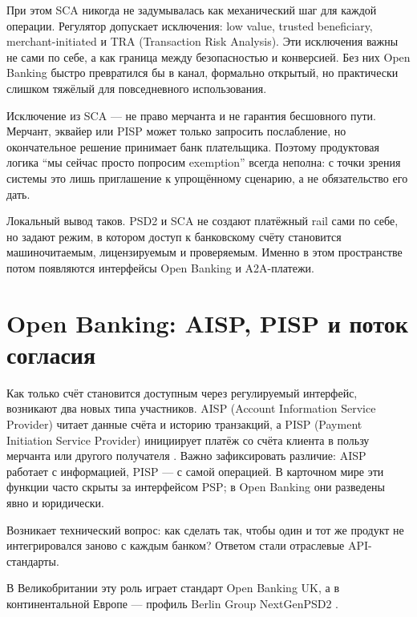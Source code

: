 При этом SCA никогда не задумывалась как механический шаг для каждой
операции. Регулятор допускает исключения: low value, trusted beneficiary,
merchant-initiated и TRA (Transaction Risk Analysis). Эти исключения
важны не сами по себе, а как граница между безопасностью и конверсией.
Без них Open Banking быстро превратился бы в канал, формально открытый,
но практически слишком тяжёлый для повседневного использования.

\begin{kaobox}[title=Важно, colback=red!5, colbacktitle=red!20]
  Исключение из SCA — не право мерчанта и не гарантия бесшовного пути.
  Мерчант, эквайер или PISP может только запросить послабление,
  но окончательное решение принимает банк плательщика. Поэтому
  продуктовая логика \enquote{мы сейчас просто попросим exemption}
  всегда неполна: с точки зрения системы это лишь приглашение
  к упрощённому сценарию, а не обязательство его дать.
\end{kaobox}

Локальный вывод таков. PSD2 и SCA не создают платёжный rail сами
по себе, но задают режим, в котором доступ к банковскому счёту
становится машиночитаемым, лицензируемым и проверяемым. Именно
в этом пространстве потом появляются интерфейсы Open Banking
и A2A-платежи.

\section{Open Banking: AISP, PISP и поток согласия}
\label{sec:open-banking}

Как только счёт становится доступным через регулируемый интерфейс,
возникают два новых типа участников. AISP (Account Information Service
Provider) читает данные счёта и историю транзакций, а PISP (Payment
Initiation Service Provider) инициирует платёж со счёта клиента
в пользу мерчанта или другого получателя . Важно
зафиксировать различие: AISP работает с информацией, PISP — с самой
операцией. В карточном мире эти функции часто скрыты за интерфейсом PSP;
в Open Banking они разведены явно и юридически.

Возникает технический вопрос: как сделать так, чтобы один и тот же
продукт не интегрировался заново с каждым банком? Ответом стали
отраслевые API-стандарты.

В Великобритании эту роль играет стандарт Open Banking UK,
а в континентальной Европе — профиль Berlin Group
NextGenPSD2 .

